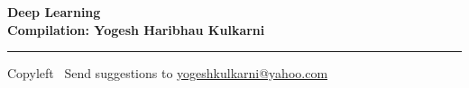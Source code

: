 
\graphicspath{{images/}}



\footnotesize


\begin{center}
\Large{\textbf{Deep Learning\\ Compilation: Yogesh Haribhau Kulkarni}}  
\end{center}

\begin{multicols}{2}

\end{multicols}

\rule{\linewidth}{0.25pt}
\scriptsize
Copyleft \textcopyleft\  Send suggestions to 
\href{http://www.yogeshkulkarni.com}{yogeshkulkarni@yahoo.com}


